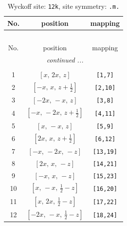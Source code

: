 \documentclass[fleqn,8pt]{jsarticle}
\begin{document}
\begin{longtable}{ccc}
\caption{Wyckoff site: {\tt 12k}, site symmetry: {\tt .m.}}
 \\
 \hline \hline
No. & position & mapping \\ \hline \endfirsthead

\multicolumn{2}{l}{\tablename\ \thetable{}} \\
 \hline \hline
No. & position & mapping \\ \hline \endhead

 \hline \hline
\multicolumn{2}{r}{\footnotesize\it continued ...} \\ \endfoot

 \hline \hline
\multicolumn{2}{r}{} \\ \endlastfoot

1 & $\left[ x,\, 2 x,\, z \right]$ & {\tt [1,7]} \\ \hline
2 & $\left[ - x,\, x,\, z + \frac{1}{2} \right]$ & {\tt [2,10]} \\ \hline
3 & $\left[ - 2 x,\, - x,\, z \right]$ & {\tt [3,8]} \\ \hline
4 & $\left[ - x,\, - 2 x,\, z + \frac{1}{2} \right]$ & {\tt [4,11]} \\ \hline
5 & $\left[ x,\, - x,\, z \right]$ & {\tt [5,9]} \\ \hline
6 & $\left[ 2 x,\, x,\, z + \frac{1}{2} \right]$ & {\tt [6,12]} \\ \hline
7 & $\left[ - x,\, - 2 x,\, - z \right]$ & {\tt [13,19]} \\ \hline
8 & $\left[ 2 x,\, x,\, - z \right]$ & {\tt [14,21]} \\ \hline
9 & $\left[ - x,\, x,\, - z \right]$ & {\tt [15,23]} \\ \hline
10 & $\left[ x,\, - x,\, \frac{1}{2} - z \right]$ & {\tt [16,20]} \\ \hline
11 & $\left[ x,\, 2 x,\, \frac{1}{2} - z \right]$ & {\tt [17,22]} \\ \hline
12 & $\left[ - 2 x,\, - x,\, \frac{1}{2} - z \right]$ & {\tt [18,24]} \\
\end{longtable}
\renewcommand{\arraystretch}{1.2}
\end{document}

